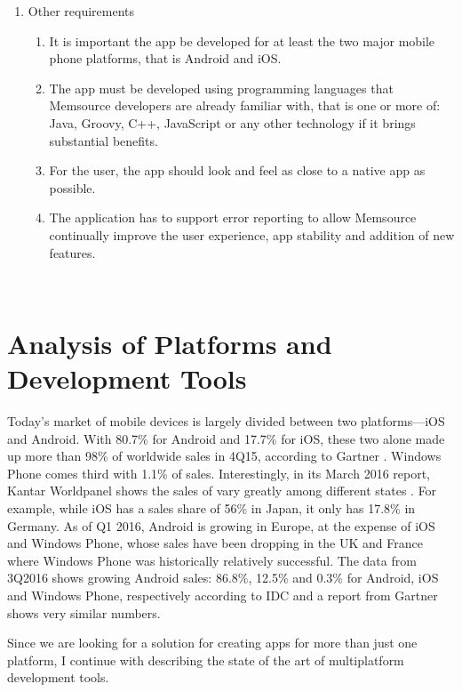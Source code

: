 \begin{enumerate}
\begin{enumerate}[label*=\arabic*.]
	\end{enumerate}
	
	
	
	\item Other requirements
	\begin{enumerate}[label*=\arabic*.]
		\item It is important the app be developed for at least the two major mobile phone platforms, that is Android and iOS.
		\item The app must be developed using programming languages that Memsource developers are already familiar with, that is one or more of: Java, Groovy, C++, JavaScript or any other technology if it brings substantial benefits.
		\item For the user, the app should look and feel as close to a native app as possible.
		\item The application has to support error reporting to allow Memsource continually improve the user experience, app stability and addition of new features.
	\end{enumerate}
	
\end{enumerate}
~


\section{Analysis of Platforms and Development Tools}

Today's market of mobile devices is largely divided between two platforms---iOS and Android. With 80.7\% for Android and 17.7\% for iOS, these two alone made up more than 98\% of worldwide sales in 4Q15, according to Gartner \cite{gartner}. Windows Phone comes third with 1.1\% of sales. Interestingly, in its March 2016 report, Kantar Worldpanel shows the sales of vary greatly among different states \cite{kantar}. For example, while iOS has a sales share of 56\% in Japan, it only has 17.8\% in Germany. As of Q1 2016, Android is growing in Europe, at the expense of iOS and Windows Phone, whose sales have been dropping in the UK and France where Windows Phone was historically relatively successful. The data from 3Q2016 shows growing Android sales: 86.8\%, 12.5\% and 0.3\% for Android, iOS and Windows Phone, respectively according to IDC \cite{idc:marketShare} and a report from Gartner \cite{gartner2} shows very similar numbers.


Since we are looking for a solution for creating apps for more than just one platform, I continue with describing the state of the art of multiplatform development tools.

